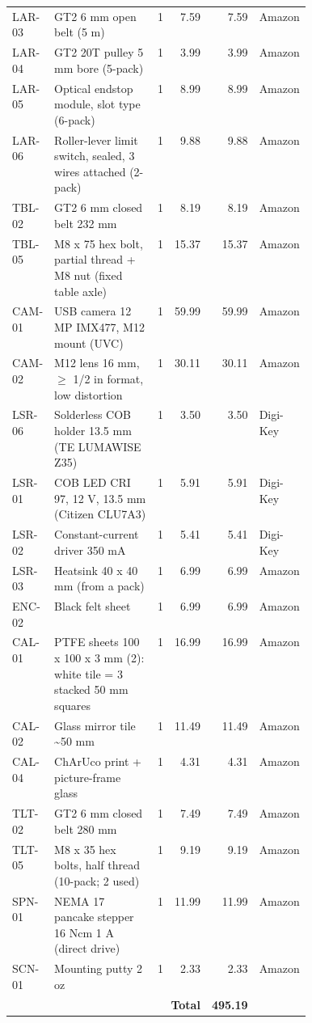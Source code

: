 {\begin{longtable}{|l|p{0.43\linewidth}|r|r|r|l|}
LAR-03 & GT2 6 mm open belt (5 m) & 1 & 7.59 & 7.59 & Amazon \\
LAR-04 & GT2 20T pulley 5 mm bore (5-pack) & 1 & 3.99 & 3.99 & Amazon \\
LAR-05 & Optical endstop module, slot type (6-pack) & 1 & 8.99 & 8.99 & Amazon \\
LAR-06 & Roller-lever limit switch, sealed, 3 wires attached (2-pack) & 1 & 9.88 & 9.88 & Amazon \\
TBL-02 & GT2 6 mm closed belt 232 mm & 1 & 8.19 & 8.19 & Amazon \\
TBL-05 & M8 x 75 hex bolt, partial thread + M8 nut (fixed table axle) & 1 & 15.37 & 15.37 & Amazon \\
CAM-01 & USB camera 12 MP IMX477, M12 mount (UVC) & 1 & 59.99 & 59.99 & Amazon \\
CAM-02 & M12 lens 16 mm, $\geq$ 1/2 in format, low distortion & 1 & 30.11 & 30.11 & Amazon \\
LSR-06 & Solderless COB holder 13.5 mm (TE LUMAWISE Z35) & 1 & 3.50 & 3.50 & Digi-Key \\
LSR-01 & COB LED CRI 97, 12 V, 13.5 mm (Citizen CLU7A3) & 1 & 5.91 & 5.91 & Digi-Key \\
LSR-02 & Constant-current driver 350 mA & 1 & 5.41 & 5.41 & Digi-Key \\
LSR-03 & Heatsink 40 x 40 mm (from a pack) & 1 & 6.99 & 6.99 & Amazon \\
ENC-02 & Black felt sheet & 1 & 6.99 & 6.99 & Amazon \\
CAL-01 & PTFE sheets 100 x 100 x 3 mm (2): white tile = 3 stacked 50 mm squares & 1 & 16.99 & 16.99 & Amazon \\
CAL-02 & Glass mirror tile \textasciitilde{}50 mm & 1 & 11.49 & 11.49 & Amazon \\
CAL-04 & ChArUco print + picture-frame glass & 1 & 4.31 & 4.31 & Amazon \\
TLT-02 & GT2 6 mm closed belt 280 mm & 1 & 7.49 & 7.49 & Amazon \\
TLT-05 & M8 x 35 hex bolts, half thread (10-pack; 2 used) & 1 & 9.19 & 9.19 & Amazon \\
SPN-01 & NEMA 17 pancake stepper 16 Ncm 1 A (direct drive) & 1 & 11.99 & 11.99 & Amazon \\
SCN-01 & Mounting putty 2 oz & 1 & 2.33 & 2.33 & Amazon \\
\hline\multicolumn{4}{|r|}{\textbf{Total}} & \textbf{495.19} & \multicolumn{1}{l|}{} \\ \hline
\end{longtable}}
